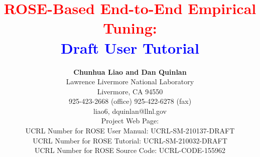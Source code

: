 \documentclass[10pt]{article}
\begin{document}

\title{ {\bf \textcolor{red}{ROSE-Based End-to-End Empirical Tuning:} \\ 
              \textcolor{blue}{Draft User Tutorial} \\
              } }
\author{ {\bf Chunhua Liao and Dan Quinlan} \\
         Lawrence Livermore National Laboratory \\ 
         Livermore, CA  94550 \\
         925-423-2668 (office)  925-422-6278 (fax) \\
         {liao6, dquinlan}@llnl.gov \\
         Project Web Page:
          \\
         UCRL Number for ROSE User Manual: UCRL-SM-210137-DRAFT \\
         UCRL Number for ROSE Tutorial: UCRL-SM-210032-DRAFT \\
         UCRL Number for ROSE Source Code: UCRL-CODE-155962 \\ \\
          \\
          \\
       }
\maketitle
\newpage


\setcounter{tocdepth}{1}

\tableofcontents
\newpage
%










\listoffixmes
\end{document}

